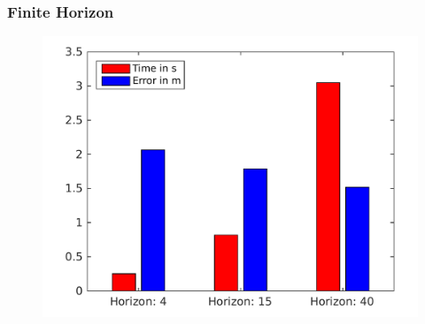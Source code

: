 \begin{frame}
\frametitle{Finite Horizon}
\begin{figure}
	\centering
	\includegraphics[width=0.9\columnwidth]{images/neu/horizonPlot.pdf}
\end{figure}




\end{frame}
%